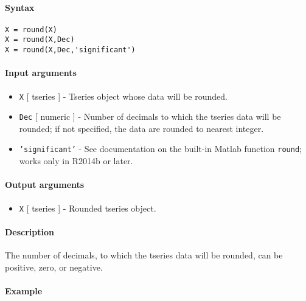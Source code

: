 


	\paragraph{Syntax}

\begin{verbatim}
X = round(X)
X = round(X,Dec)
X = round(X,Dec,'significant')
\end{verbatim}

\paragraph{Input arguments}

\begin{itemize}
\item
  \texttt{X} {[} tseries {]} - Tseries object whose data will be
  rounded.
\item
  \texttt{Dec} {[} numeric {]} - Number of decimals to which the tseries
  data will be rounded; if not specified, the data are rounded to
  nearest integer.
\item
  \texttt{'significant'} - See documentation on the built-in Matlab
  function \texttt{round}; works only in R2014b or later.
\end{itemize}

\paragraph{Output arguments}

\begin{itemize}
\itemsep1pt\parskip0pt
\item
  \texttt{X} {[} tseries {]} - Rounded tseries object.
\end{itemize}

\paragraph{Description}

The number of decimals, to which the tseries data will be rounded, can
be positive, zero, or negative.

\paragraph{Example}


